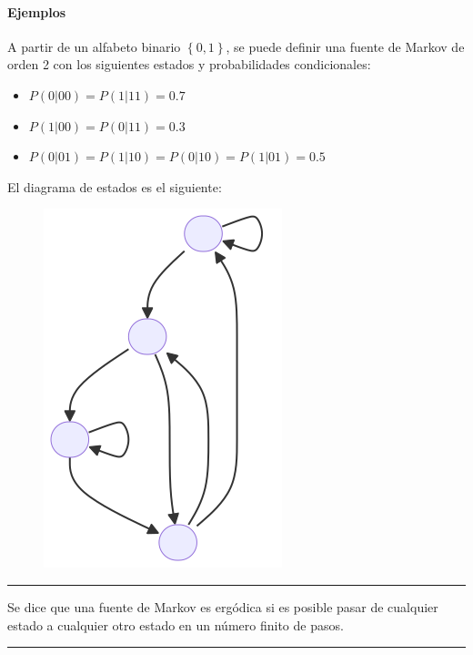 \paragraph{Ejemplos}\label{ejemplos-fuentes-de-informacion}

A partir de un alfabeto binario \(\left\{0,1\right\}\), se puede definir
una fuente de Markov de orden 2 con los siguientes estados y
probabilidades condicionales:

\begin{itemize}
\tightlist
\item
  \(P(0|00)=P(1|11)=0.7\)
\item
  \(P(1|00)=P(0|11)=0.3\)
\item
  \(P(0|01)=P(1|10)=P(0|10)=P(1|01)=0.5\)
\end{itemize}

El diagrama de estados es el siguiente:

\begin{figure}[htbp!]
\centering
\includegraphics[width=0.5\linewidth]{./img/fuente-de-markov-diagrama-de-estados.png}
\end{figure}

\begin{center}\rule{0.5\linewidth}{0.5pt}\end{center}

Se dice que una fuente de Markov es ergódica si es posible pasar de
cualquier estado a cualquier otro estado en un número finito de pasos.

\begin{center}\rule{0.5\linewidth}{0.5pt}\end{center}

